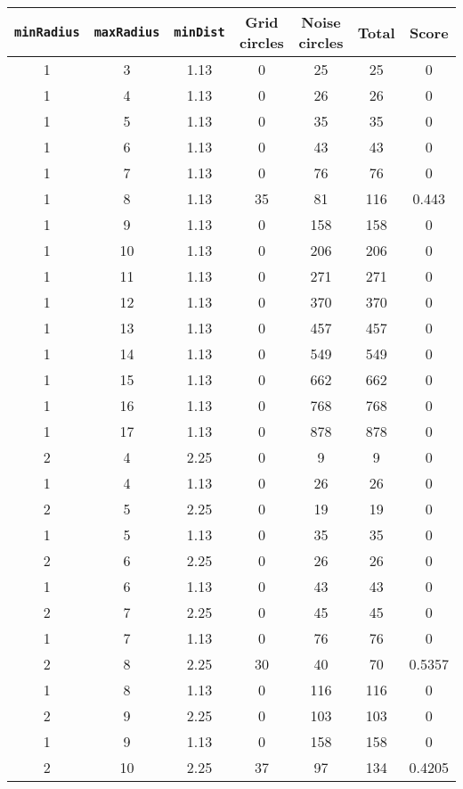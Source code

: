 \documentclass[letterpaper, 12pt]{article}
\begin{document}
\begin{longtable}{|c|c|c|c|c|c|c|}
\hline
\textbf{\texttt{minRadius}} & \textbf{\texttt{maxRadius}} & \textbf{\texttt{minDist}} & \textbf{Grid circles} & \textbf{Noise circles} & \textbf{Total} & \textbf{Score} \\
\hline
1 & 3 & 1.13 & 0 & 25 & 25 & 0 \\
\hline
1 & 4 & 1.13 & 0 & 26 & 26 & 0 \\
\hline
1 & 5 & 1.13 & 0 & 35 & 35 & 0 \\
\hline
1 & 6 & 1.13 & 0 & 43 & 43 & 0 \\
\hline
1 & 7 & 1.13 & 0 & 76 & 76 & 0 \\
\hline
1 & 8 & 1.13 & 35 & 81 & 116 & 0.443 \\
\hline
1 & 9 & 1.13 & 0 & 158 & 158 & 0 \\
\hline
1 & 10 & 1.13 & 0 & 206 & 206 & 0 \\
\hline
1 & 11 & 1.13 & 0 & 271 & 271 & 0 \\
\hline
1 & 12 & 1.13 & 0 & 370 & 370 & 0 \\
\hline
1 & 13 & 1.13 & 0 & 457 & 457 & 0 \\
\hline
1 & 14 & 1.13 & 0 & 549 & 549 & 0 \\
\hline
1 & 15 & 1.13 & 0 & 662 & 662 & 0 \\
\hline
1 & 16 & 1.13 & 0 & 768 & 768 & 0 \\
\hline
1 & 17 & 1.13 & 0 & 878 & 878 & 0 \\
\hline
2 & 4 & 2.25 & 0 & 9 & 9 & 0 \\
\hline
1 & 4 & 1.13 & 0 & 26 & 26 & 0 \\
\hline
2 & 5 & 2.25 & 0 & 19 & 19 & 0 \\
\hline
1 & 5 & 1.13 & 0 & 35 & 35 & 0 \\
\hline
2 & 6 & 2.25 & 0 & 26 & 26 & 0 \\
\hline
1 & 6 & 1.13 & 0 & 43 & 43 & 0 \\
\hline
2 & 7 & 2.25 & 0 & 45 & 45 & 0 \\
\hline
1 & 7 & 1.13 & 0 & 76 & 76 & 0 \\
\hline
2 & 8 & 2.25 & 30 & 40 & 70 & 0.5357 \\
\hline
1 & 8 & 1.13 & 0 & 116 & 116 & 0 \\
\hline
2 & 9 & 2.25 & 0 & 103 & 103 & 0 \\
\hline
1 & 9 & 1.13 & 0 & 158 & 158 & 0 \\
\hline
2 & 10 & 2.25 & 37 & 97 & 134 & 0.4205 \\

\end{longtable}
\end{document}
